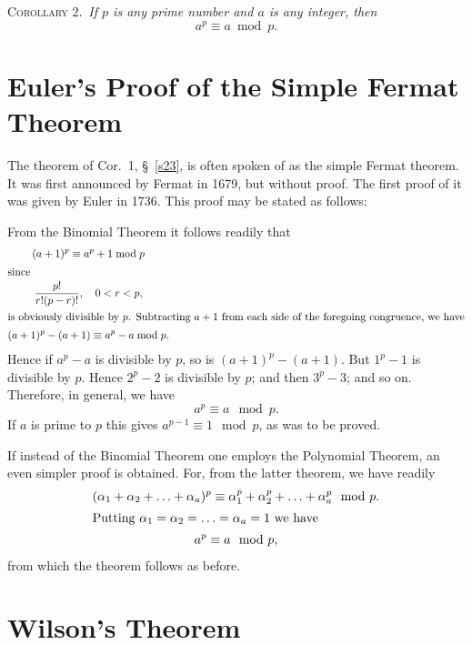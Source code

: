 \documentclass[oneside]{book}
\begin{document}
\smallskip \textsc{Corollary 2.}~\emph{If $p$ is any prime number
and $a$ is any integer, then}
\begin{equation*}
a^p \equiv a \bmod p.
\end{equation*}

\section{Euler's Proof of the Simple Fermat Theorem}\label{s24}%

The theorem of Cor.\ 1, \S~\ref{s23}, is often spoken of as the
simple Fermat theorem. It was first announced by Fermat in 1679, but
without proof. The first proof of it was given by Euler in 1736.
This proof may be stated as follows:

From the Binomial Theorem it follows readily that
\begin{gather*}
(a+1)^p \equiv a^p + 1 \bmod p \\
\intertext{since}
\frac{p!}{r!(p-r)!}, \quad 0 < r < p, \\
\intertext{is obviously divisible by $p$. Subtracting $a + 1$ from
each side of the foregoing congruence, we have}
(a+1)^p - (a+1) \equiv a^p - a \bmod p.
\end{gather*}
Hence if $a^p - a$ is divisible by $p$, so is $(a + 1)^p - (a + 1)$.
But $1^p - 1$ is divisible by $p$. Hence $2^p - 2$ is divisible by
$p$; and then $3^p - 3$; and so on. Therefore, in general, we have
\begin{equation*}
a^p \equiv a \mod p.
\end{equation*}
If $a$ is prime to $p$ this gives $a^{p-1} \equiv 1 \mod p$, as was
to be proved.

If instead of the Binomial Theorem one employs the Polynomial
Theorem, an even simpler proof is obtained. For, from the latter
theorem, we have readily
\begin{gather*}
(\alpha_1 + \alpha_2 + \ldots + \alpha_a)^p \equiv
  \alpha_1^p + \alpha_2^p + \ldots + \alpha_a^p \mod p. \\
\intertext{Putting $\alpha_1 = \alpha_2 = \ldots = \alpha_a = 1$ we
have}
a^p\equiv a \mod p,
\end{gather*}
from which the theorem follows as before.

\section{Wilson's Theorem}\label{s25}
\end{document}
